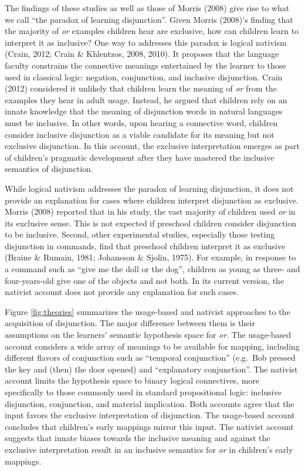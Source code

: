 \documentclass[,man,floatsintext]{apa6}
\begin{document}
The findings of these studies as well as those of Morris (2008) give rise to what we call \enquote{the paradox of learning disjunction}. Given Morris (2008)'s finding that the majority of \emph{or} examples children hear are exclusive, how can children learn to interpret it as inclusive? One way to addresses this paradox is logical nativism (Crain, 2012; Crain \& Khlentzos, 2008, 2010). It proposes that the language faculty constrains the connective meanings entertained by the learner to those used in classical logic: negation, conjunction, and inclusive disjunction. Crain (2012) considered it unlikely that children learn the meaning of \emph{or} from the examples they hear in adult usage. Instead, he argued that children rely on an innate knowledge that the meaning of disjunction words in natural languages must be inclusive. In other words, upon hearing a connective word, children consider inclusive disjunction as a viable candidate for its meaning but not exclusive disjunction. In this account, the exclusive interpretation emerges as part of children's pragmatic development after they have mastered the inclusive semantics of disjunction.

While logical nativism addresses the paradox of learning disjunction, it does not provide an explanation for cases where children interpret disjunction as exclusive. Morris (2008) reported that in his study, the vast majority of children used \emph{or} in its exclusive sense. This is not expected if preschool children consider disjunction to be inclusive. Second, other experimental studies, especially those testing disjunction in commands, find that preschool children interpret it as exclusive (Braine \& Rumain, 1981; Johansson \& Sjolin, 1975). For example, in response to a command such as \enquote{give me the doll or the dog}, children as young as three- and four-years-old give one of the objects and not both. In its current version, the nativist account does not provide any explanation for such cases.

Figure \ref{fig:theories} summarizes the usage-based and nativist approaches to the acquisition of disjunction. The major difference between them is their assumptions on the learners' semantic hypothesis space for \emph{or}. The usage-based account considers a wide array of meanings to be available for mapping, including different flavors of conjunction such as \enquote{temporal conjunction} (e.g.~Bob pressed the key and (then) the door opened) and \enquote{explanatory conjunction}. The nativist account limits the hypothesis space to binary logical connectives, more specifically to those commonly used in standard propositional logic: inclusive disjunction, conjunction, and material implication. Both accounts agree that the input favors the exclusive interpretation of disjunction. The usage-based account concludes that children's early mappings mirror this input. The nativist account suggests that innate biases towards the inclusive meaning and against the exclusive interpretation result in an inclusive semantics for \emph{or} in children's early mappings.
\end{document}
